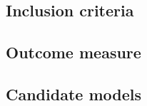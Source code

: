 \documentclass[onecolumn]{article}
\begin{document}

\subsection{Inclusion criteria}















\subsection{Outcome measure}


\subsection{Candidate models}
\end{document}
